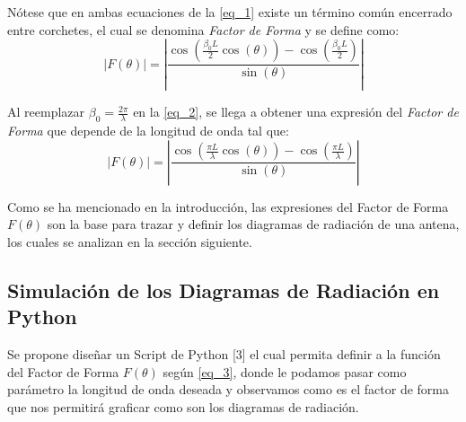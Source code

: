 \documentclass[12pt,a4paper]{article}
\begin{document}
Nótese que en ambas ecuaciones de la \autoref{eq_1} existe un término común encerrado entre corchetes, el cual se denomina \textit{Factor de Forma} y se define como:
\begin{equation}
    \left| F(\theta) \right| = \left| \frac{\cos\left( \frac{\beta_{0}L}{2}\cos(\theta) \right) - \cos\left( \frac{\beta_{0}L}{2} \right)}{\sin(\theta)}\right|
    \label{eq_2}
\end{equation}

Al reemplazar $\beta_{0} = \frac{2\pi}{\lambda}$ en la \autoref{eq_2}, se llega a obtener una expresión del \textit{Factor de Forma} que depende de la longitud de onda tal que:
\begin{equation}
    \left| F(\theta) \right| = \left| \frac{\cos\left( \frac{\pi L}{\lambda}\cos(\theta) \right) - \cos\left( \frac{\pi L}{\lambda} \right)}{\sin(\theta)}\right|
    \label{eq_3}
\end{equation}

Como se ha mencionado en la introducción, las expresiones del Factor de Forma $F(\theta)$ son la base para trazar y definir los diagramas de radiación de una antena, los cuales se analizan en la sección siguiente.



\subsection{Simulación de los Diagramas de Radiación en Python}
Se propone diseñar un Script de Python [3] el cual permita definir a la función del Factor de Forma $F(\theta)$ según \autoref{eq_3}, donde le podamos pasar como parámetro la longitud de onda deseada y observamos como es el factor de forma que nos permitirá graficar como son los diagramas de radiación.
\end{document}

